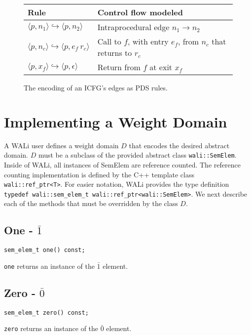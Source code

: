 \documentclass[english,a4paper,11pt]{article}
\theoremstyle{definition}
\def\ONE{\bar{1}}
\def\ZERO{\bar{0}}
\def\eps{\epsilon}
\def\WALi{\textsf{WALi}\xspace}
\newcommand{\conf}[1]{\langle #1 \rangle}
\newcommand{\Rule}[2]{\conf{#1}\hookrightarrow\conf{#2}}
\begin{document}
\begin{figure}[h]
\begin{center}
\begin{tabular}{|l|l|}
  \hline
  Rule & Control flow modeled \\
  \hline \hline
  $\Rule{p,n_1}{p,n_2}$   & Intraprocedural edge $n_1 \to n_2$ \\
  $\Rule{p,n_c}{p,e_f\ r_c}$ & Call to $f$, with entry $e_f$, from $n_c$ that returns to $r_c$ \\
  $\Rule{p,x_f}{p, \eps}$  & Return from $f$ at exit $x_f$ \\
\hline
\end{tabular}
\end{center}
\caption{The encoding of an ICFG's edges as PDS rules.}
\label{Fi:icfgencoding}
\end{figure}

\section{Implementing a Weight Domain}
\label{Se:WeightDomains}
\begin{sloppypar}
A \WALi user defines a weight domain $D$ that encodes the desired
abstract domain. $D$ must be a subclass of
the provided abstract class \verb!wali::SemElem!. Inside of \WALi, all
instances of SemElem are reference counted. The reference counting
implementation is defined by the C++ template class \verb!wali::ref_ptr<T>!.
For easier notation, \WALi provides the type definition
\verb!typedef wali::sem_elem_t wali::ref_ptr<wali::SemElem>!.
We next describe each of the methods that must be overridden by the class $D$.
\end{sloppypar}

\subsection{One - $\ONE$}
\begin{verbatim}
sem_elem_t one() const;
\end{verbatim}
\verb!one! returns an instance of the $\ONE$ element.

\subsection{Zero - $\ZERO$}
\begin{verbatim}
sem_elem_t zero() const;
\end{verbatim}
\verb!zero! returns an instance of the $\ZERO$ element.
\end{document}
